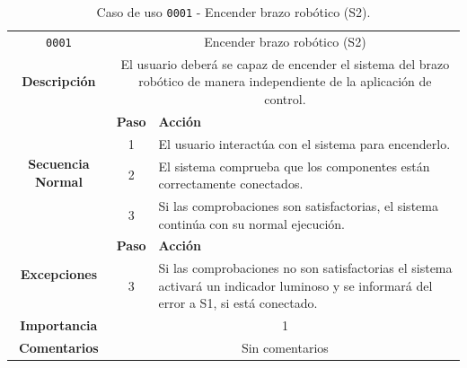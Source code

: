 \begin{table}[H]
    \centering
    \begin{tabularx}{\textwidth}{|c|c|X|}
        \cline{1-3}
        \texttt{0001}                              & \multicolumn{2}{c|}{Encender brazo robótico (\ac{S2})}                                                                                                                      \\ \cline{1-3}
        \textbf{Descripción}                       & \multicolumn{2}{m{13cm}|}{El usuario deberá se capaz de encender el sistema del brazo robótico de manera independiente de la aplicación de control.}
        \\ \cline{1-3}
        \multirow{4}{*}{\textbf{Secuencia Normal}} & \textbf{Paso} & \textbf{Acción}
        \\ \cline{2-3}                    &   1  & El usuario interactúa con el sistema para encenderlo.
        \\ \cline{2-3}                    &   2  & El sistema comprueba que los componentes están correctamente conectados.
        \\ \cline{2-3}                    &   3  & Si las comprobaciones son satisfactorias, el sistema continúa con su normal ejecución.
        \\ \cline{1-3}
        \multirow{2}{*}{\textbf{Excepciones}}      & \textbf{Paso}                                                                                                                                        & \textbf{Acción}
        \\ \cline{2-3}                    &   3  & Si las comprobaciones no son satisfactorias el sistema activará un indicador luminoso y se informará del error a \ac{S1}, si está conectado.
        \\ \cline{1-3}
        \textbf{Importancia}                       & \multicolumn{2}{c|}{1}                                                                                                                                                 \\ \cline{1-3}
        \textbf{Comentarios}                       & \multicolumn{2}{c|}{Sin comentarios}                                                                                                                                   \\ \cline{1-3}
    \end{tabularx}
    \caption{Caso de uso \texttt{0001} - Encender brazo robótico (\ac{S2}).}
    \label{tab:CU0001}
    \label{tab:caso_de_uso_encender_brazo_robotico}
\end{table}

